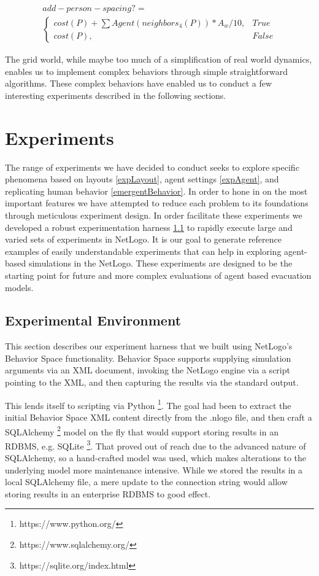 \documentclass[12pt,letterpaper]{article}
\begin{document}
\begin{align}
add-person-spacing?= \nonumber  \\
\begin{cases}
	cost(P) + \sum Agent(neighbors_4(P)) * A_w / 10, & True \\
	cost(P), & False
\end{cases}
\end{align}

The grid world, while maybe too much of a simplification of real world dynamics, enables us to implement complex behaviors through simple straightforward algorithms.  These complex behaviors have enabled us to conduct a few interesting experiments described in the following sections.

\section{Experiments}

The range of experiments we have decided to conduct seeks to explore specific phenomena based on layouts \ref{expLayout}, agent settings \ref{expAgent}, and replicating human behavior \ref{emergentBehavior}.  In order to hone in on the most important features we have attempted to reduce each problem to its foundations through meticulous experiment design.  In order facilitate these experiments we developed a robust experimentation harness \ref{expEnv} to rapidly execute large and varied sets of experiments in NetLogo.  It is our goal to generate reference examples of easily understandable experiments that can help in exploring agent-based simulations in the NetLogo.  These experiments are designed to be the starting point for future and more complex evaluations of agent based evacuation models.


\subsection{Experimental Environment} \label{expEnv}
This section describes our experiment harness that we built using NetLogo's
Behavior Space functionality.  Behavior Space supports supplying simulation arguments via an XML document,
invoking the NetLogo engine via a script pointing to the XML, and then capturing
the results via the standard output.

This lends itself to scripting via Python \footnote{https://www.python.org/}. The goal had been to extract the
initial Behavior Space XML content directly from the .nlogo file, and then craft
a SQLAlchemy \footnote{https://www.sqlalchemy.org/} model on the fly that would support storing results in an RDBMS,
e.g. SQLite \footnote{https://sqlite.org/index.html}. That proved out of reach due to the advanced nature of SQLAlchemy,
so a hand-crafted model was used, which makes alterations to the underlying
model more maintenance intensive.  While we stored the results in a local SQLAlchemy file, a mere update to the
connection string would allow storing results in an enterprise RDBMS to good
effect.
\end{document}

